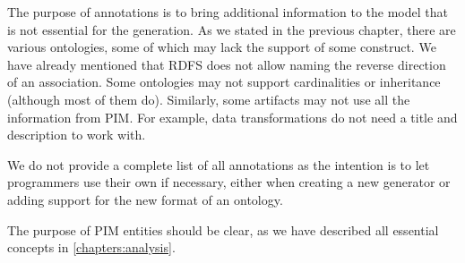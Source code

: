 The purpose of annotations is to bring additional information to the model that is not essential for the generation. As we stated in the previous chapter, there are various ontologies, some of which may lack the support of some construct. We have already mentioned that RDFS does not allow naming the reverse direction of an association. Some ontologies may not support cardinalities or inheritance (although most of them do). Similarly, some artifacts may not use all the information from PIM. For example, data transformations do not need a title and description to work with.

We do not provide a complete list of all annotations as the intention is to let programmers use their own if necessary, either when creating a new generator or adding support for the new format of an ontology.

The purpose of PIM entities should be clear, as we have described all essential concepts in \autoref{chapters:analysis}.

